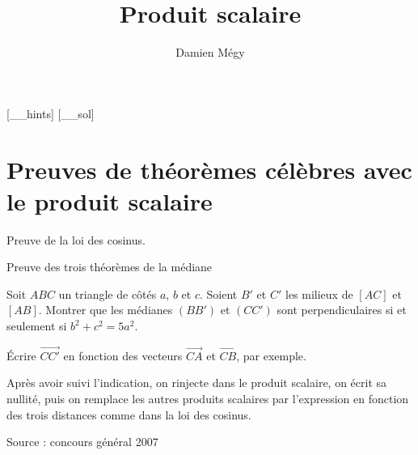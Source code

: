





[_\jobname_hints]
[_\jobname_sol]


\title{Produit scalaire}
\author{Damien Mégy}
\maketitle

\avertissement

\section{Preuves de théorèmes célèbres avec le produit scalaire}

\begin{exo}
Preuve de la loi des cosinus.
\begin{hint}
\end{hint}
\begin{sol}
\end{sol}
\end{exo}

\begin{exo}
Preuve des trois théorèmes de la médiane
\begin{hint}
\end{hint}
\begin{sol}
\end{sol}
\end{exo}

\begin{exo}
Soit $ABC$ un triangle de côtés $a$, $b$ et $c$.
Soient $B'$ et $C'$ les milieux de $[AC]$ et $[AB]$.
Montrer que les médianes $(BB')$ et $(CC')$ sont perpendiculaires si et seulement si $b^2+c^2=5a^2$.
\begin{hint}
Écrire $\vec{CC'}$ en fonction des vecteurs $\vec{CA}$ et $\vec{CB}$, par exemple.
\end{hint}
\begin{sol}
Après avoir suivi l'indication, on rinjecte dans le produit scalaire, on écrit sa nullité, puis on remplace les autres produits scalaires par l'expression en fonction des trois distances comme dans la loi des cosinus.

Source : concours général 2007
\end{sol}
\end{exo}

